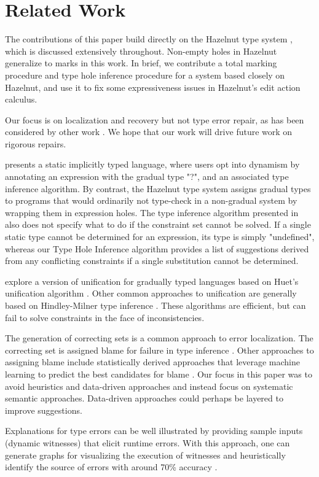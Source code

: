 \section{Related Work}
\label{sec:related}

The contributions of this paper build directly on the Hazelnut type system \cite{HazelnutPOPL}, which is discussed extensively throughout. Non-empty holes in Hazelnut generalize to marks in this work. In brief, we contribute a total marking procedure and type hole inference procedure for a system based closely on Hazelnut, and use it to fix some expressiveness issues in Hazelnut's edit action calculus.

Our focus is on localization and recovery but not type error repair, as has been considered by other work \cite{lerner07}. We hope that our work will drive future work on rigorous repairs.

\citet{garcia:2015} presents a static implicitly typed language, where users opt into dynamism by annotating an expression with the gradual type "?", and an associated type inference algorithm. By contrast, the Hazelnut type system assigns gradual types to programs that would ordinarily not type-check in a non-gradual system by wrapping them in expression holes. The type inference algorithm presented in \citet{garcia:2015} also does not specify what to do if the constraint set cannot be solved. If a single static type cannot be determined for an expression, its type is simply "undefined", whereas our Type Hole Inference algorithm provides a list of suggestions derived from any conflicting constraints if a single substitution cannot be determined.

\citet{GradualInfer} explore a version of unification for gradually typed languages based on Huet's unification algorithm \cite{Huet}. Other common approaches to unification are generally based on Hindley-Milner type inference \cite{MilnerInfer}. These algorithms are efficient, but can fail to solve constraints in the face of inconsistencies.


The generation of correcting sets is a common approach to error localization. The correcting set is assigned blame for failure in type inference \cite{sherrloc, typeinferDif, Pavlinovic2015}. Other approaches to assigning blame include statistically derived approaches that leverage machine learning to predict the best candidates for blame \cite{SeidelBlame}. Our focus in this paper was to avoid heuristics and data-driven approaches and instead focus on systematic semantic approaches. Data-driven approaches could perhaps be layered to improve suggestions.

Explanations for type errors can be well illustrated by providing sample inputs (dynamic witnesses) that elicit runtime errors. With this approach, one can generate graphs for visualizing the execution of witnesses and heuristically identify the source of errors with around 70\% accuracy \cite{Seidel2016}.
